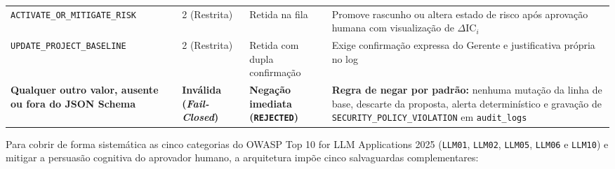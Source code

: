 \documentclass[12pt,openany,oneside,a4paper,english,brazilian,sumario=tradicional]{abntex2}
\newcommand{\fonteautores}{\par\vspace{1mm}{\small Fonte: Elaborado pelos autores (2026).}}
\newcommand{\IC}{\mathrm{IC}}
\begin{document}
\begin{table}[htbp]
{\begin{tabularx}{\textwidth}{L{4.2cm} L{2.0cm} L{2.8cm} Y}
\texttt{ACTIVATE\_\allowbreak OR\_\allowbreak MITIGATE\_\allowbreak RISK} & 2 (Restrita) & Retida na fila & Promove rascunho ou altera estado de risco após aprovação humana com visualização de $\Delta\IC_i$\\
\texttt{UPDATE\_\allowbreak PROJECT\_\allowbreak BASELINE} & 2 (Restrita) & Retida com dupla confirmação & Exige confirmação expressa do Gerente e justificativa própria no log\\
\textbf{Qualquer outro valor, ausente ou fora do JSON Schema} & \textbf{Inválida (\textit{Fail-Closed})} & \textbf{Negação imediata (\texttt{REJECTED})} & \textbf{Regra de negar por padrão:} nenhuma mutação da linha de base, descarte da proposta, alerta determinístico e gravação de \texttt{SECURITY\_\allowbreak POLICY\_\allowbreak }\allowbreak\texttt{VIOLATION} em \texttt{audit\_\allowbreak logs}\\
\bottomrule
\end{tabularx}}
\fonteautores
\end{table}

Para cobrir de forma sistemática as cinco categorias do OWASP Top 10 for LLM Applications 2025 (\texttt{LLM01}, \texttt{LLM02}, \texttt{LLM05}, \texttt{LLM06} e \texttt{LLM10}) e mitigar a persuasão cognitiva do aprovador humano, a arquitetura impõe cinco salvaguardas complementares:
\end{document}
